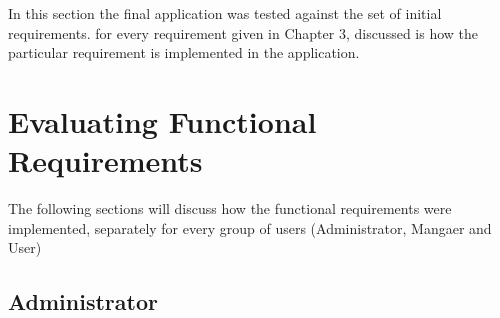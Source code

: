 \documentclass[a4paper,11pt,twoside]{report}
\theoremstyle{definition}
\begin{document}
In this section the final application was tested against the set of initial requirements. for every requirement given in Chapter 3, discussed is how the particular requirement is implemented in the application.

\section{Evaluating Functional Requirements}

The following sections will discuss how the functional requirements were implemented, separately for every group of users (Administrator, Mangaer and User)

\subsection{Administrator}
\end{document}
